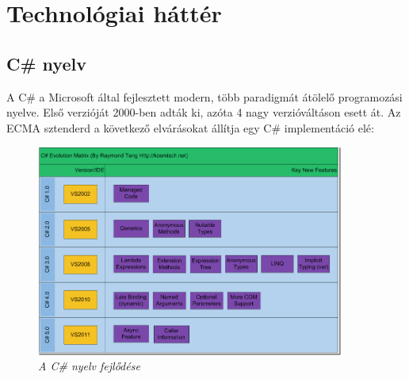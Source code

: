 \documentclass[a4paper,12pt]{report}
\begin{document}


\newpage

\section{Technológiai háttér}

\subsection{C\# nyelv}

A C\# a Microsoft által fejlesztett modern, több paradigmát átölelő programozási nyelve. Első verzióját 2000-ben adták ki, azóta 4 nagy verzióváltáson esett át. Az ECMA sztenderd\cite{ecmacs} a következő elvárásokat állítja egy C\# implementáció elé: 

\begin{figure}[h!]
  \caption{\textit{A C\# nyelv fejlődése}}
  \centering
    \includegraphics[width=0.9\textwidth]{images/csharpevolution.png}
\end{figure}
\end{document}
